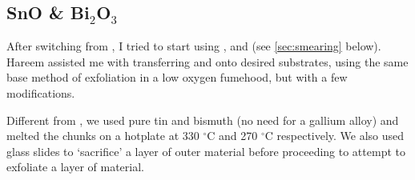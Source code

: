 \documentclass[../Matt_Gebert_Honours_Thesis.tex]{subfiles}
\begin{document}
	\subsection{SnO \& Bi$_2$O$_3$}
	After switching from \aluminimumoxide{}, I tried to start using \tinoxide{}, \bismuthoxide{} and \galliumoxide{}(see \cref{sec:smearing} below). Hareem assisted me with transferring \bismuthoxide{} and \tinoxide{} onto desired substrates, using the same base method of exfoliation in a low oxygen fumehood, but with a few modifications. 
	
	Different from \aluminimumoxide{}, we used pure tin and bismuth (no need for a gallium alloy) and melted the chunks on a hotplate at 330 $^\circ$C and 270 $^\circ$C  respectively. We also used glass slides to `sacrifice' a layer of outer material before proceeding to attempt to exfoliate a layer of material.
	
\end{document}
